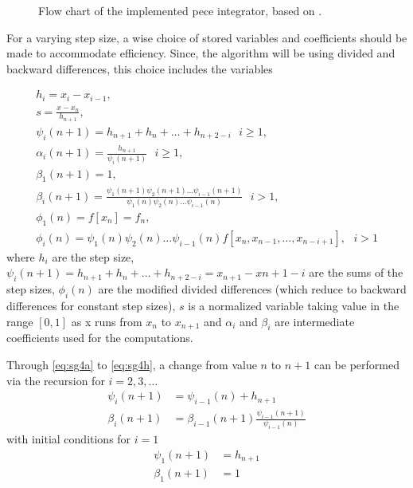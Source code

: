 \begin{figure}
  \centering
  
  \caption{Flow chart of the implemented \gls{pece} integrator, based 
    on \cite{Shampine1975}.}
  \label{fig:sgode}
\end{figure}

For a varying step size, a wise choice of stored variables and coefficients 
should be made to accommodate efficiency. Since, the algorithm will be using divided 
and backward differences, this choice includes the variables

\begin{gather}
  h_i  = x_i - x_{i-1}, \label{eq:sg4a}\\
  s    = \frac{x - x_n}{h_{n+1}}, \label{eq:sg4b}\\
  \psi _i (n+1)   = h_{n+1} + h_{n} + \dots + h_{n+2-i} \text{ } i \ge 1, \label{eq:sg4c}\\
  \alpha _i (n+1) = \frac{h_{n+1}}{\psi _i (n+1)} \text{ } i \ge 1, \label{eq:sg4d}\\
  \beta _1 (n+1)  = 1, \label{eq:sg4e}\\
  \beta _i (n+1)  = \frac{\psi _1 (n+1) \psi _2 (n+1) \dots \psi _{i-1}(n+1)}{\psi _1 (n) \psi _2 (n) \dots \psi _{i-1}(n)} \text{ } i > 1, \label{eq:sg4f}\\
  \phi _1(n) = f[x_n] = f_n, \label{eq:sg4g}\\
  \phi _i(n) = \psi _1 (n) \psi _2 (n) \dots \psi _{i-1}(n) f[x_n,x_{n-1},\dots ,x_{n-i+1}], \text{ } i > 1 \label{eq:sg4h}
\end{gather}
where $h_i$ are the step size, 
$\psi _i(n+1) = h_{n+1} + h_{n} + \dots + h_{n+2-i} = x_{n+1}-x{n+1-i}$ are the 
sums of the step sizes, $\phi _{i}(n)$ are the modified divided differences (which 
reduce to backward differences for constant step sizes), $s$ is a normalized variable 
taking value in the range $[0,1]$ as x runs from $x_n$ to $x_{n+1}$ and $\alpha _i$ 
and $\beta _i$ are intermediate coefficients used for the computations.

Through \autoref{eq:sg4a} to \autoref{eq:sg4h}, a change from value $n$ to $n+1$ 
can be performed via the recursion for $i=2,3,\dots$
\begin{equation}
  \begin{aligned}
    \psi _i(n+1)   &= \psi _{i-1}(n) + h_{n+1} \\
    \beta _i(n+1)  &= \beta _{i-1}(n+1) \frac{\psi _{i-1}(n+1)}{\psi _{i-1}(n)}
  \end{aligned}
\end{equation}
with initial conditions for $i=1$
\begin{equation}
  \begin{aligned}
    \psi _1(n+1)   &= h_{n+1} \\
    \beta _1(n+1)  &= 1
  \end{aligned}
\end{equation}

